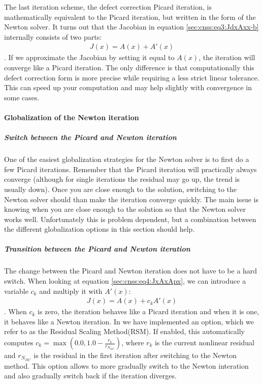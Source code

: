 The last iteration scheme, the defect correction Picard iteration, is mathematically 
equivalent to the Picard iteration, but written in the form of the Newton solver. It 
turns out that the Jacobian in equation \ref{sec:cnss:eq3:JdxAxx-b} internally consists
of two parts: 
\begin{align}
    \label{sec:cnss:eq4:JxAxApx}
    J(x) = A(x) + A'(x) 
\end{align}. If we approximate the Jacobian by setting it 
equal to $A(x)$, the iteration will converge like a Picard iteration. The only difference 
is that computationally this defect correction form is more precise while requiring a less strict
linear tolerance. This can speed up your computation and may help slightly with convergence
in some cases. 

\paragraph{Globalization of the Newton iteration}
\label{sec:cnns:globalization}

\subparagraph{Switch between the Picard and Newton iteration}
One of the easiest globalization strategies for the Newton solver is to first do a few
Picard iterations. Remember that the Picard iteration will practically always converge 
(although for single iterations the residual may go up, the trend is usually down). Once
you are close enough to the solution, switching to the Newton solver should than make 
the iteration converge quickly. The main issue is knowing when you are close enough to 
the solution so that the Newton solver works well. Unfortunately this is problem dependent,
but a combination between the different globalization options in this section should help.

\subparagraph{Transition between the Picard and Newton iteration}
The change between the Picard and Newton iteration does not have to be a hard switch. 
When looking at equation \ref{sec:cnss:eq4:JxAxApx}, we can introduce a variable $c_k$
and multiply it with $A'(x)$:
\begin{align}
    J(x) = A(x) + c_k A'(x) 
\end{align}. When $c_k$ is zero, the iteration behaves like a Picard iteration and when 
it is one, it behaves like a Newton iteration. In \aspect{} we have implemented an option, 
which we refer to as the Residual Scaling Method(RSM). If enabled, this automatically 
computes $c_k = \max\left(0.0,1.0-\frac{r_k}{r_{N_{DC}}}\right)$, where $r_k$ 
is the current nonlinear residual and $r_{N_{DC}}$ is the residual in the first iteration 
after switching to the Newton method. This option allows to more gradually switch to the 
Newton interation and also gradually switch back if the iteration diverges. 


